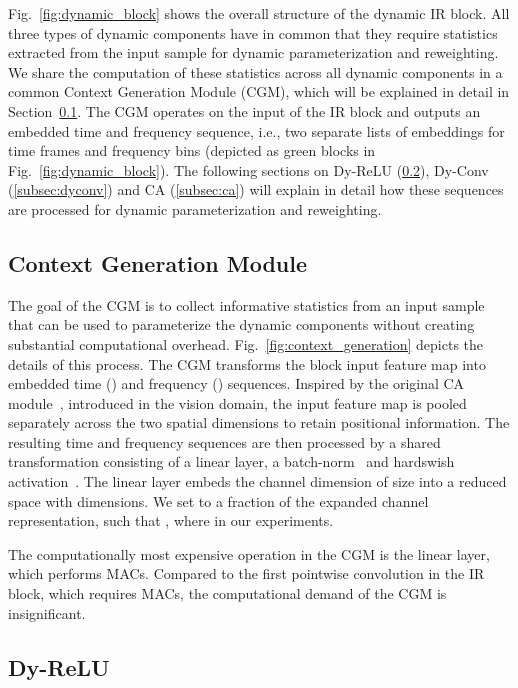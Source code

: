 \documentclass[lettersize,journal]{IEEEtran}
\begin{document}
Fig.~\ref{fig:dynamic_block} shows the overall structure of the dynamic IR block. All three types of dynamic components have in common that they require statistics extracted from the input sample for dynamic parameterization and reweighting. We share the computation of these statistics across all dynamic components in a common Context Generation Module (CGM), which will be explained in detail in Section~\ref{subsec:cgm}. The CGM operates on the input of the IR block and outputs an embedded time and frequency sequence, i.e., two separate lists of embeddings for time frames and frequency bins (depicted as green blocks in Fig.~\ref{fig:dynamic_block}). The following sections on Dy-ReLU (\ref{subsec:dyrelu}), Dy-Conv (\ref{subsec:dyconv}) and CA (\ref{subsec:ca}) will explain in detail how these sequences are processed for dynamic parameterization and reweighting.

\subsection{Context Generation Module}
\label{subsec:cgm}

The goal of the CGM is to collect informative statistics from an input sample that can be used to parameterize the dynamic components without creating substantial computational overhead. Fig.~\ref{fig:context_generation} depicts the details of this process. The CGM transforms the block input feature map into embedded time () and frequency () sequences. Inspired by the original CA module~\cite{hou2021coordinate}, introduced in the vision domain, the input feature map is pooled separately across the two spatial dimensions to retain positional information. The resulting time and frequency sequences are then processed by a shared transformation consisting of a linear layer, a batch-norm~\cite{ioffe2015batch} and hardswish activation~\cite{Howard19MobileNetV3}. The linear layer embeds the channel dimension of size  into a reduced space with  dimensions. We set  to a fraction of the expanded channel representation, such that , where  in our experiments.

The computationally most expensive operation in the CGM is the linear layer, which performs  MACs. Compared to the first pointwise convolution in the IR block, which requires  MACs, the computational demand of the CGM is insignificant.



\subsection{Dy-ReLU}
\label{subsec:dyrelu}
\end{document}
